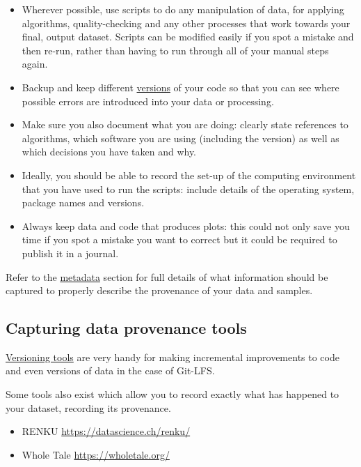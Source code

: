 \documentclass[a4paper,oneside]{report}
\providecommand{\tightlist}{%
  \setlength{\itemsep}{0pt}\setlength{\parskip}{0pt}}
\begin{document}
\begin{itemize}
\tightlist
\item
  Wherever possible, use scripts to do any manipulation of data, for
  applying algorithms, quality-checking and any other processes that
  work towards your final, output dataset. Scripts can be modified
  easily if you spot a mistake and then re-run, rather than having to
  run through all of your manual steps again.
\item
  Backup and keep different
  \protect\hyperlink{versioning-tools}{versions} of your code so that
  you can see where possible errors are introduced into your data or
  processing.
\item
  Make sure you also document what you are doing: clearly state
  references to algorithms, which software you are using (including the
  version) as well as which decisions you have taken and why.
\item
  Ideally, you should be able to record the set-up of the computing
  environment that you have used to run the scripts: include details of
  the operating system, package names and versions.
\item
  Always keep data and code that produces plots: this could not only
  save you time if you spot a mistake you want to correct but it could
  be required to publish it in a journal.
\end{itemize}

Refer to the \protect\hyperlink{metadata}{metadata} section for full
details of what information should be captured to properly describe the
provenance of your data and samples.

\hypertarget{capturing-data-provenance-tools}{%
\subsection{Capturing data provenance
tools}\label{capturing-data-provenance-tools}}

\protect\hyperlink{versioning-tools}{Versioning tools} are very handy
for making incremental improvements to code and even versions of data in
the case of Git-LFS.

Some tools also exist which allow you to record exactly what has
happened to your dataset, recording its provenance.

\begin{itemize}
\tightlist
\item
  RENKU \url{https://datascience.ch/renku/}
\item
  Whole Tale \url{https://wholetale.org/}
\end{itemize}
\end{document}
